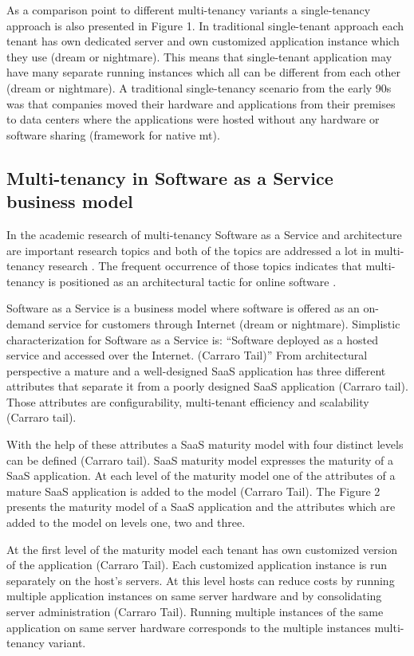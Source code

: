 \documentclass[conference]{sasmoota2017}
\begin{document}
As a comparison point to different multi-tenancy variants a single-tenancy approach is also presented in Figure 1. In traditional single-tenant approach each tenant has own dedicated server and own customized application instance which they use (dream or nightmare). This means that single-tenant application may have many separate running instances which all can be different from each other (dream or nightmare). A traditional single-tenancy scenario from the early 90s was that companies moved their hardware and applications from their premises to data centers where the applications were hosted without any hardware or software sharing (framework for native mt). 

\subsection{Multi-tenancy in Software as a Service business model}

In the academic research of multi-tenancy Software as a Service and architecture are important research topics and both of the topics are addressed a lot in multi-tenancy research \cite{Kabbedijk2015:Defining}. The frequent occurrence of those topics indicates that multi-tenancy is positioned as an architectural tactic for online software \cite{Kabbedijk2015:Defining}. 

Software as a Service is a business model where software is offered as an on-demand service for customers through Internet (dream or nightmare). Simplistic characterization for Software as a Service is: “Software deployed as a hosted service and accessed over the Internet. (Carraro Tail)” From architectural perspective a mature and a well-designed SaaS application has three different attributes that separate it from a poorly designed SaaS application (Carraro tail). Those attributes are configurability, multi-tenant efficiency and scalability (Carraro tail).

With the help of these attributes a SaaS maturity model with four distinct levels can be defined (Carraro tail). SaaS maturity model expresses the maturity of a SaaS application. At each level of the maturity model one of the attributes of a mature SaaS application is added to the model (Carraro Tail). The Figure 2 presents the maturity model of a SaaS application and the attributes which are added to the model on levels one, two and three. 

At the first level of the maturity model each tenant has own customized version of the application (Carraro Tail). Each customized application instance is run separately on the host’s servers. At this level hosts can reduce costs by running multiple application instances on same server hardware and by consolidating server administration (Carraro Tail). Running multiple instances of the same application on same server hardware corresponds to the multiple instances multi-tenancy variant. 
\end{document}
